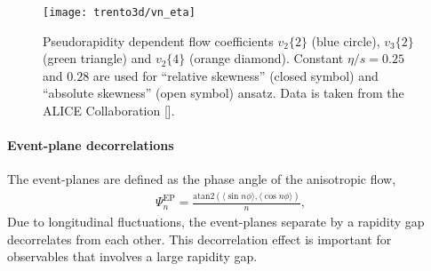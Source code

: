 \begin{figure}
\texttt{[image: trento3d/vn\_eta]}
\caption{Pseudorapidity dependent flow coefficients $v_2\{2\}$ (blue circle), $v_3\{2\}$ (green triangle) and $v_2\{4\}$ (orange diamond).
Constant $\eta/s=0.25$ and $0.28$ are used for ``relative skewness'' (closed symbol) and ``absolute skewness'' (open symbol) ansatz. Data is taken from the ALICE Collaboration [].}
\label{fig:trento:vn_eta}
\end{figure}

\paragraph{Event-plane decorrelations} The event-planes are defined as the phase angle of the anisotropic flow,
\begin{eqnarray}
\Psi_n^\text{EP} = \frac{\text{atan2}(\langle \sin n \phi \rangle, \langle\cos n \phi \rangle)}{n},
\end{eqnarray}
Due to longitudinal fluctuations, the event-planes separate by a rapidity gap decorrelates from each other.
This decorrelation effect is important for observables that involves a large rapidity gap.

